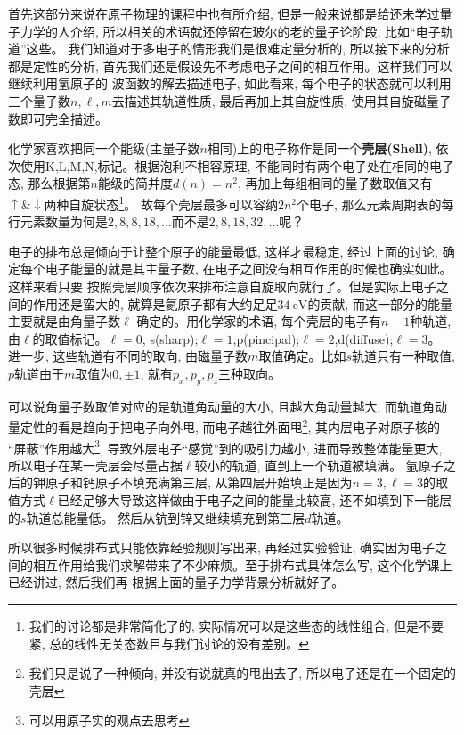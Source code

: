 \documentclass[a4paper,zihao=-4,linespread=1]{ctexrep}
\begin{document}
    首先这部分来说在原子物理的课程中也有所介绍, 但是一般来说都是给还未学过量子力学的人介绍, 所以相关的术语就还停留在玻尔的老的量子论阶段, 比如“电子轨道”这些。
    我们知道对于多电子的情形我们是很难定量分析的, 所以接下来的分析都是定性的分析, 首先我们还是假设先不考虑电子之间的相互作用。这样我们可以继续利用氢原子的
    波函数的解去描述电子, 如此看来, 每个电子的状态就可以利用三个量子数$n,\ell,m$去描述其轨道性质, 最后再加上其自旋性质, 使用其自旋磁量子数即可完全描述。

    化学家喜欢把同一个能级(主量子数$n$相同)上的电子称作是同一个\textbf{壳层(Shell)}, 依次使用K,L,M,N,标记。根据泡利不相容原理, 不能同时有两个电子处在相同的电子态, 
    那么根据第$n$能级的简并度$d(n)=n^2$, 再加上每组相同的量子数取值又有$\uparrow\&\downarrow$两种自旋状态\footnote{我们的讨论都是非常简化了的, 实际情况可以是这些态的线性组合, 但是不要紧, 总的线性无关态数目与我们讨论的没有差别。}。
    故每个壳层最多可以容纳$2n^2$个电子, 那么元素周期表的每行元素数量为何是$2,8,8,18,\ldots$而不是$2,8,18,32,\ldots$呢？

    电子的排布总是倾向于让整个原子的能量最低, 这样才最稳定, 经过上面的讨论, 确定每个电子能量的就是其主量子数, 在电子之间没有相互作用的时候也确实如此。这样来看只要
    按照壳层顺序依次来排布注意自旋取向就行了。但是实际上电子之间的作用还是蛮大的, 就算是氦原子都有大约足足$\SI{34}{\eV}$的贡献, 而这一部分的能量主要就是由角量子数$\ell$
    确定的。用化学家的术语, 每个壳层的电子有$n-1$种轨道, 由$\ell$的取值标记。$\ell=0$, s(sharp);$\ell=1$,p(pincipal);$\ell=2$,d(diffuse);$\ell=3$。
    进一步, 这些轨道有不同的取向, 由磁量子数$m$取值确定。比如$s$轨道只有一种取值, $p$轨道由于$m$取值为$0,\pm 1$, 就有$p_x,p_y,p_z$三种取向。

    可以说角量子数取值对应的是轨道角动量的大小, 且越大角动量越大, 而轨道角动量定性的看是趋向于把电子向外甩, 而电子越往外面甩\footnote{我们只是说了一种倾向, 并没有说就真的甩出去了, 所以电子还是在一个固定的壳层}, 其内层电子对原子核的
    “屏蔽”作用越大\footnote{可以用原子实的观点去思考}, 导致外层电子“感觉”到的吸引力越小, 进而导致整体能量更大, 所以电子在某一壳层会尽量占据$\ell$较小的轨道, 直到上一个轨道被填满。
    氩原子之后的钾原子和钙原子不填充满第三层, 从第四层开始填正是因为$n=3,\ell=3$的取值方式$\ell$已经足够大导致这样做由于电子之间的能量比较高, 还不如填到下一能层的$s$轨道总能量低。
    然后从钪到锌又继续填充到第三层$d$轨道。

    所以很多时候排布式只能依靠经验规则写出来, 再经过实验验证, 确实因为电子之间的相互作用给我们求解带来了不少麻烦。至于排布式具体怎么写, 这个化学课上已经讲过, 然后我们再
    根据上面的量子力学背景分析就好了。
\end{document}
